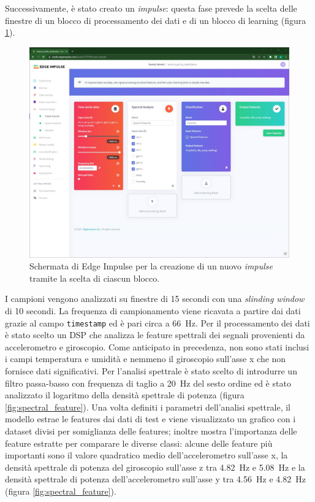 Successivamente, è stato creato un \textit{impulse}: questa fase prevede la scelta delle finestre di un blocco di processamento dei dati e di un blocco di learning (figura \ref{fig:creazione_impulse}).
\begin{figure}[b!]
	\centering
	\includegraphics[width=0.5\linewidth]{./ImageFiles/creazione_impulse.jpg}
	\caption{Schermata di Edge Impulse per la creazione di un nuovo \textit{impulse} tramite la scelta di ciascun blocco.}
	\label{fig:creazione_impulse}
\end{figure}
I campioni vengono analizzati su finestre di 15 secondi con una \textit{slinding window} di 10 secondi. La frequenza di campionamento viene ricavata a partire dai dati grazie al campo \texttt{timestamp} ed è pari circa a \SI{66}{\hertz}.
Per il processamento dei dati è stato scelto un DSP che analizza le feature spettrali dei segnali provenienti da accelerometro e giroscopio. Come anticipato in precedenza, non sono stati inclusi i campi temperatura e umidità e nemmeno il giroscopio sull'asse x che non fornisce dati significativi.
Per l'analisi spettrale è stato scelto di introdurre un filtro passa-basso con frequenza di taglio a \SI{20}{\hertz} del sesto ordine ed è stato analizzato il logaritmo della densità spettrale di potenza (figura \ref{fig:spectral_feature}). Una volta definiti i parametri dell'analisi spettrale, il modello estrae le features dai dati di test e viene visualizzato un grafico con i dataset divisi per somiglianza delle features; inoltre mostra l'importanza delle feature estratte per comparare le diverse classi: alcune delle feature più importanti sono il valore quadratico medio dell'accelerometro sull'asse x, la densità spettrale di potenza del giroscopio sull'asse z tra \SI{4.82}{\hertz} e \SI{5.08}{\hertz} e la densità spettrale di potenza dell'accelerometro sull'asse y tra \SI{4.56}{\hertz} e \SI{4.82}{\hertz} (figura \ref{fig:spectral_feature}). 
